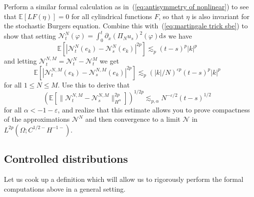 \documentclass[a4paper,11pt]{article}
\newcommand{\mathd}{\mathrm{d}}
\begin{document}
\begin{exercise}
  Perform a similar formal calculation as in~(\ref{eq:antisymmetry of
  nonlinear}) to see that $\mathbb{E} [L F (\eta)] = 0$ for all cylindrical
  functions $F$, so that $\eta$ is also invariant for the stochastic Burgers
  equation. Combine this with~(\ref{eq:martingale trick sbe}) to show that
  setting $\mathcal{N}_t^N (\varphi) = \int_0^t \partial_x (\Pi_N u_s)^2
  (\varphi) \mathd s$ we have
  \[ \mathbb{E} [| \mathcal{N}_t^N (e_k) -\mathcal{N}_s^N (e_k) |^{2 p}]
     \lesssim_p (t - s)^p | k |^p \]
  and letting $\mathcal{N}_t^{N, M} =\mathcal{N}_t^N -\mathcal{N}_t^M$ we get
  \[ \mathbb{E} [| \mathcal{N}_t^{N, M} (e_k) -\mathcal{N}_s^{N, M} (e_k)
     |^{2 p}] \lesssim_p (| k | / N)^{\varepsilon p} (t - s)^p | k |^p \]
  for all $1 \leqslant N \leqslant M$. Use this to derive that
  \[ (\mathbb{E} [\| \mathcal{N}_t^{N, M} -\mathcal{N}_s^{N, M} \|^{2
     p}_{H^{\alpha}}])^{1 / 2 p} \lesssim_{p, \alpha} N^{- \varepsilon / 2} (t
     - s)^{1 / 2} \]
  for all $\alpha < - 1 - \varepsilon$, and realize that this estimate allows
  you to prove compactness of the approximations $\mathcal{N}^N$ and then
  convergence to a limit $\mathcal{N}$ in $L^{2 p} (\Omega ; C^{1 / 2 -} H^{-
  1 -})$.
\end{exercise}

\subsection{Controlled distributions}

Let us cook up a definition which will allow us to rigorously perform the
formal computations above in a general setting.
\end{document}
